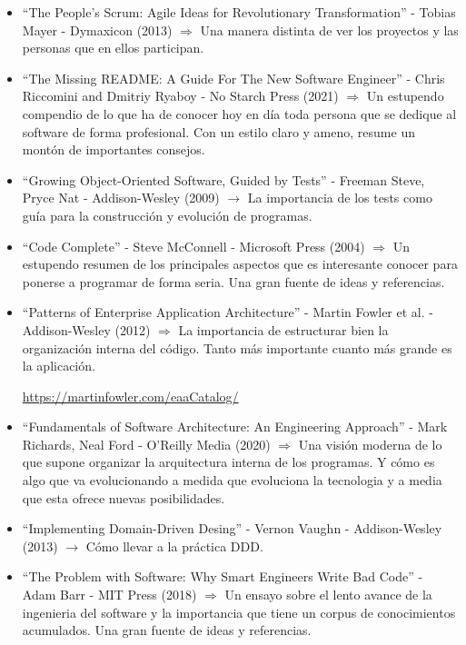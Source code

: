 \documentclass[spanish,12pt,a4paper,final,oneside]{book}
\begin{document}
\begin{itemize}
\item ``The People's Scrum: Agile Ideas for Revolutionary Transformation'' - Tobias Mayer - Dymaxicon (2013) $\Rightarrow$ Una manera distinta de ver los proyectos y las personas que en ellos participan. 

\item ``The Missing README: A Guide For The New Software Engineer'' - Chris Riccomini and Dmitriy Ryaboy - No Starch Press (2021) $\Rightarrow$ Un estupendo compendio de lo que ha de conocer hoy en día toda persona que se dedique al software de forma profesional. Con un estilo claro y ameno, resume un montón de importantes consejos.

\item ``Growing Object-Oriented Software, Guided by Tests'' - Freeman Steve, Pryce Nat - Addison-Wesley (2009) $\rightarrow$ La importancia de los tests como guía para la construcción y evolución de programas.

\item ``Code Complete'' - Steve McConnell - Microsoft Press (2004) $\Rightarrow$ Un estupendo resumen de los principales aspectos que es interesante conocer para ponerse a programar de forma seria. Una gran fuente de ideas y referencias.

\item ``Patterns of Enterprise Application Architecture'' - Martin Fowler et al. - Addison-Wesley (2012) $\Rightarrow$ La importancia de estructurar bien la organización interna del código. Tanto más importante cuanto más grande es la aplicación.   

\url{https://martinfowler.com/eaaCatalog/}

\item ``Fundamentals of Software Architecture: An Engineering Approach'' - Mark Richards, Neal Ford - O'Reilly Media (2020) $\Rightarrow$ Una visión moderna de lo que supone organizar la arquitectura interna de los programas. Y cómo es algo que va evolucionando a medida que evoluciona la tecnologia y a media que esta ofrece nuevas posibilidades.

\item ``Implementing Domain-Driven Desing'' - Vernon Vaughn - Addison-Wesley (2013) $\rightarrow$ Cómo llevar a la práctica DDD.

\item ``The Problem with Software: Why Smart Engineers Write Bad Code'' - Adam Barr - MIT Press (2018) $\Rightarrow$ Un ensayo sobre el lento avance de la ingenieria del software y la importancia que tiene un corpus de conocimientos acumulados. Una gran fuente de ideas y referencias. 


\end{itemize}
\end{document}
